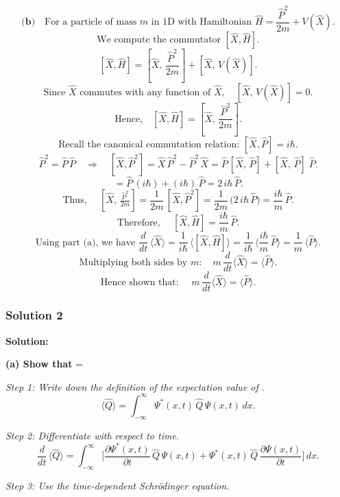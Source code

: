 \documentclass{article}
\begin{document}
\[
\textbf{(b)} \quad
\text{For a particle of mass } m \text{ in 1D with Hamiltonian } \hat{H} = \frac{\hat{P}^2}{2m} + V(\hat{X}).
\]
\[
\text{We compute the commutator } [\hat{X}, \hat{H}].
\]
\[
[\hat{X}, \hat{H}]
=
\left[\hat{X},\,\frac{\hat{P}^2}{2m}\right] 
+ 
[\hat{X},\,V(\hat{X})].
\]
\[
\text{Since } \hat{X} \text{ commutes with any function of } \hat{X}, 
\quad
[\hat{X},\,V(\hat{X})] = 0.
\]
\[
\text{Hence,}
\quad
[\hat{X}, \hat{H}]
=
\left[\hat{X},\,\frac{\hat{P}^2}{2m}\right].
\]
\[
\text{Recall the canonical commutation relation: } [\hat{X}, \hat{P}] = i\hbar.
\]
\[
\hat{P}^2 = \hat{P}\,\hat{P} 
\quad \Longrightarrow \quad
[\hat{X}, \hat{P}^2]
=
\hat{X}\,\hat{P}^2 - \hat{P}^2\,\hat{X} 
=
\hat{P}\,[\hat{X},\,\hat{P}] + [\hat{X},\,\hat{P}]\;\hat{P}.
\]
\[
= 
\hat{P}\,(i\hbar) + (i\hbar)\,\hat{P}
=
2\,i\hbar\,\hat{P}.
\]
\[
\text{Thus, }
\quad
[\hat{X},\,\tfrac{\hat{P}^2}{2m}]
=
\frac{1}{2m}\,[\hat{X}, \hat{P}^2]
=
\frac{1}{2m}\,\bigl(2\,i\hbar\,\hat{P}\bigr)
=
\frac{i\hbar}{m}\,\hat{P}.
\]
\[
\text{Therefore, }
\quad
[\hat{X}, \hat{H}]
=
\frac{i\hbar}{m}\,\hat{P}.
\]
\[
\text{Using part (a), we have }
\frac{d}{dt}\,\langle \hat{X} \rangle
=
\frac{1}{i\hbar}\,
\Big\langle
[\hat{X}, \hat{H}]
\Big\rangle
=
\frac{1}{i\hbar}\,
\Big\langle
\frac{i\hbar}{m}\,\hat{P}
\Big\rangle
=
\frac{1}{m}\,\langle \hat{P} \rangle.
\]
\[
\text{Multiplying both sides by } m:
\quad
m\,\frac{d}{dt}\langle \hat{X} \rangle
=
\langle \hat{P} \rangle.
\]
\[
\text{Hence shown that: }
\quad
m\,\frac{d}{dt}\langle \hat{X} \rangle = \langle \hat{P} \rangle.
\]

\subsubsection{Solution 2}
\textbf{Solution:}

\textbf{(a) Show that } \displaystyle {} \langle {} \rangle =   \rangle

\textit{Step 1: Write down the definition of the expectation value of } .
\[
\langle \hat{Q} \rangle = \int_{-\infty}^{\infty} \Psi^*(x,t)\,\hat{Q}\,\Psi(x,t)\,dx.
\]

\textit{Step 2: Differentiate with respect to time.}
\[
\frac{d}{dt}\,\langle \hat{Q} \rangle 
= \int_{-\infty}^{\infty} \biggl[\frac{\partial \Psi^*(x,t)}{\partial t}\,\hat{Q}\,\Psi(x,t) 
+ \Psi^*(x,t)\,\hat{Q}\,\frac{\partial \Psi(x,t)}{\partial t}\biggr]\,dx.
\]

\textit{Step 3: Use the time-dependent Schr\"odinger equation.}
\end{document}
